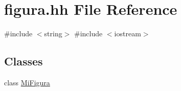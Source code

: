 \hypertarget{figura_8hh}{\section{figura.\-hh \-File \-Reference}
\label{figura_8hh}
}
{\ttfamily \#include $<$string$>$}\*
{\ttfamily \#include $<$iostream$>$}\*
\subsection*{\-Classes}
\begin{DoxyCompactItemize}
\item 
class \hyperlink{class_mi_figura}{\-Mi\-Figura}
\end{DoxyCompactItemize}

